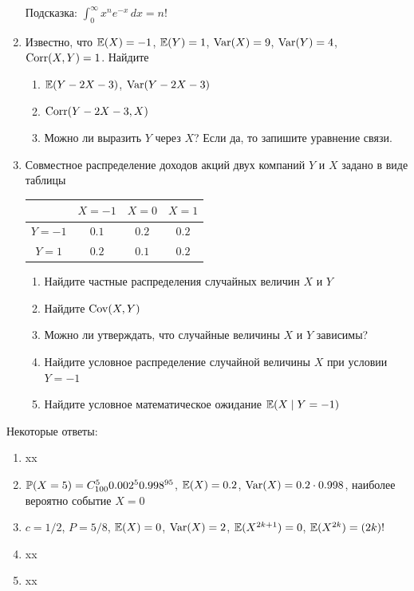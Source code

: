 \documentclass[12pt, a4paper]{article}\usepackage[]{graphicx}\usepackage[]{color}
\begin{document}
\begin{enumerate}
					Подсказка: $\int_0^{\infty} x^n e^{-x} \, dx=n!$

					\item Известно, что  $\E(X)=-1$, $\E(Y)=1$, $\Var(X)=9$, $\Var(Y)=4$, $\Corr(X,Y)=1$. Найдите
					\begin{enumerate}
						\item $\E(Y-2X-3)$, $\Var(Y-2X-3)$
						\item  $\Corr(Y-2X-3,X)$
						\item Можно ли выразить $Y$ через $X$? Если да, то запишите уравнение связи.
					\end{enumerate}

					\item Совместное распределение доходов акций двух компаний $Y$ и $X$ задано в виде таблицы

					\begin{tabular}{c|ccc}
						& $X=-1$ & $X=0$ & $X=1$ \\
						\hline
						$Y=-1$ & $0.1$ & $0.2$ & $0.2$ \\
						$Y=1$ & $0.2$ & $0.1$ & $0.2$ \\
					\end{tabular}


					\begin{enumerate}
						\item Найдите  частные распределения случайных величин $X$ и $Y$
						\item Найдите $\Cov(X,Y)$
						\item Можно ли утверждать, что случайные величины $X$ и $Y$ зависимы?
						\item Найдите условное распределение случайной величины $X$ при условии $Y=-1$
						\item Найдите условное математическое ожидание $\E(X\mid Y=-1)$
					\end{enumerate}


				\end{enumerate}

				Некоторые ответы:
				\begin{enumerate}
					\item xx
					\item $\P(X=5)=C_{100}^5 0.002^5 0.998^{95}$, $\E(X)=0.2$, $\Var(X)=0.2\cdot 0.998$, наиболее вероятно событие $X=0$
					\item $c=1/2$, $P=5/8$, $\E(X)=0$, $\Var(X)=2$, $\E(X^{2k+1})=0$, $\E(X^{2k})=(2k)!$
					\item xx
					\item xx
				\end{enumerate}
\end{document}
